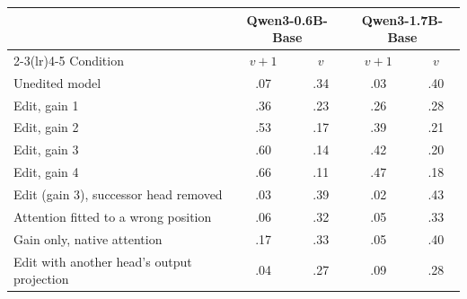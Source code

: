 \begin{tabular}{lcccc}
\toprule
 & \multicolumn{2}{c}{Qwen3-0.6B-Base} & \multicolumn{2}{c}{Qwen3-1.7B-Base} \\
\cmidrule(lr){2-3}\cmidrule(lr){4-5}
Condition & $v{+}1$ & $v$ & $v{+}1$ & $v$ \\
\midrule
Unedited model & .07 & .34 & .03 & .40 \\
Edit, gain 1 & .36 & .23 & .26 & .28 \\
Edit, gain 2 & .53 & .17 & .39 & .21 \\
Edit, gain 3 & .60 & .14 & .42 & .20 \\
Edit, gain 4 & .66 & .11 & .47 & .18 \\
\midrule
Edit (gain 3), successor head removed & .03 & .39 & .02 & .43 \\
Attention fitted to a wrong position & .06 & .32 & .05 & .33 \\
Gain only, native attention & .17 & .33 & .05 & .40 \\
Edit with another head's output projection & .04 & .27 & .09 & .28 \\
\bottomrule
\end{tabular}
